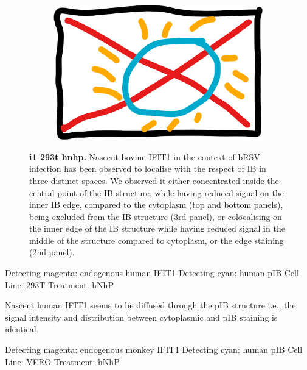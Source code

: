 \begin{figure}
\begin{subfigure}{0.5\textwidth}
    \end{subfigure}
    \begin{subfigure}{1\textwidth}
        \centering
        \caption{}
        \includegraphics[width=1\linewidth]{09. Chapter 4/Figs/00. placeholder.png}
    \end{subfigure}
    \caption[i1 293t hnhp]{\textbf{i1 293t hnhp.} Nascent bovine IFIT1 in the context of bRSV infection has been observed to localise with the respect of IB in three distinct spaces. We observed it either concentrated inside the central point of the IB structure, while having reduced signal on the inner IB edge, compared to the cytoplasm (top and bottom panels), being excluded from the IB structure (3rd panel), or colocalising on the inner edge of the IB structure while having reduced signal in the middle of the structure compared to cytoplasm, or the edge staining (2nd panel).}
    \label{fig:i1 293t hnhp}
\end{figure}

Detecting magenta: endogenous human IFIT1 \newline
Detecting cyan: human pIB \newline
Cell Line: 293T \newline
Treatment: hNhP \newline

Nascent human IFIT1 seems to be diffused through the pIB structure i.e., the signal intensity and distribution between cytoplasmic and pIB staining is identical.  

Detecting magenta: endogenous monkey IFIT1 \newline
Detecting cyan: human pIB \newline
Cell Line: VERO \newline
Treatment: hNhP \newline

